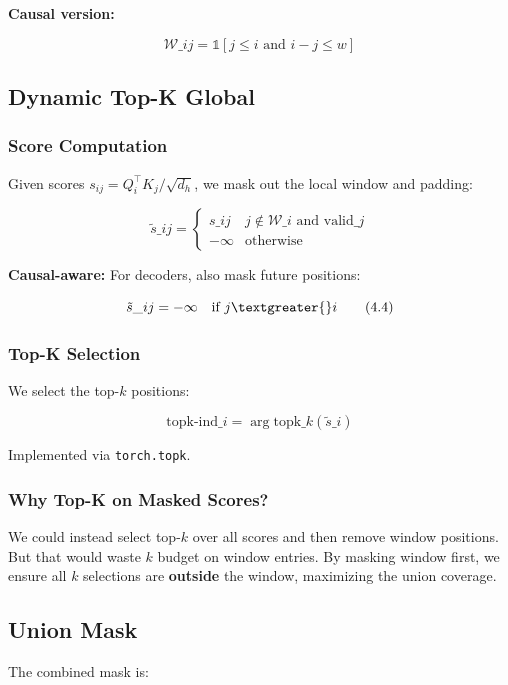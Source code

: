 \textbf{Causal version:}

\[
\mathcal{W}\_{ij} = \mathbb{1}[j \leq i \text{ and } i - j \leq w]
\tag{4.2}
\]

\subsection{Dynamic Top-K Global}

\subsubsection{Score Computation}

Given scores $s_{ij} = Q_i^\top K_j / \sqrt{d_h}$, we mask out the local 
window and padding:

\[
\tilde{s}\_{ij} = \begin{cases} s\_{ij} & j \notin \mathcal{W}\_i \text{ and valid}\_j \\ -\infty & \text{otherwise} \end{cases}
\tag{4.3}
\]

\textbf{Causal-aware:} For decoders, also mask future positions:

\[
\tilde{s}\_{ij} = -\infty \quad \text{if } j \textgreater{} i
\tag{4.4}
\]

\subsubsection{Top-K Selection}

We select the top-$k$ positions:

\[
\text{topk-ind}\_i = \arg\text{topk}\_{k}(\tilde{s}\_i)
\tag{4.5}
\]

Implemented via \texttt{torch.topk}.

\subsubsection{Why Top-K on Masked Scores?}

We could instead select top-$k$ over all scores and then remove window 
positions. But that would waste $k$ budget on window entries. By masking 
window first, we ensure all $k$ selections are \textbf{outside} the window, 
maximizing the union coverage.

\subsection{Union Mask}

The combined mask is:

